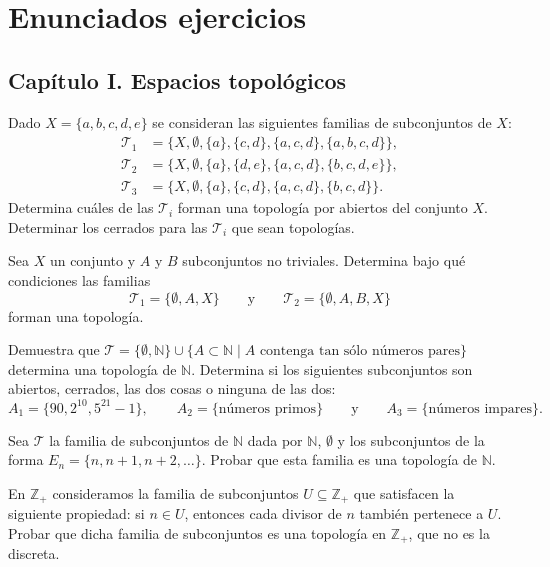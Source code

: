 \chapter{Enunciados ejercicios}
\section*{Capítulo I. Espacios topológicos}

\begin{ejer}[1]
Dado $X = \{a,b,c,d,e\}$ se consideran las siguientes familias de subconjuntos de $X$:
\begin{align*}
    \mathcal{T}_1 &= \{X, \emptyset, \{a\}, \{c,d\}, \{a,c,d\}, \{a,b,c,d\}\}, \\
    \mathcal{T}_2 &= \{X, \emptyset, \{a\}, \{d,e\}, \{a,c,d\}, \{b,c,d,e\}\}, \\
    \mathcal{T}_3 &= \{X, \emptyset, \{a\}, \{c,d\}, \{a,c,d\}, \{b,c,d\}\}.
\end{align*}
Determina cuáles de las $\mathcal{T}_i$ forman una topología por abiertos del conjunto $X$. Determinar los cerrados para las $\mathcal{T}_i$ que sean topologías.
\end{ejer}

\begin{ejer}[2]
Sea $X$ un conjunto y $A$ y $B$ subconjuntos no triviales. Determina bajo qué condiciones las familias
\[
    \mathcal{T}_1 = \{\emptyset, A, X\} \qquad \text{y} \qquad \mathcal{T}_2 = \{\emptyset, A, B, X\}
\]
forman una topología.
\end{ejer}

\begin{ejer}[3]
Demuestra que $\mathcal{T} = \{\emptyset, \mathbb{N}\} \cup \{A \subset \mathbb{N} \mid A \text{ contenga tan sólo números pares}\}$ determina una topología de $\mathbb{N}$. Determina si los siguientes subconjuntos son abiertos, cerrados, las dos cosas o ninguna de las dos:
\[
    A_1 = \{90, 2^{10}, 5^{21}-1\}, \qquad A_2 = \{\text{números primos}\} \qquad \text{y} \qquad A_3 = \{\text{números impares}\}.
\]
\end{ejer}

\begin{ejer}[4]
Sea $\mathcal{T}$ la familia de subconjuntos de $\mathbb{N}$ dada por $\mathbb{N}$, $\emptyset$ y los subconjuntos de la forma $E_n = \{n, n+1, n+2, \dots\}$. Probar que esta familia es una topología de $\mathbb{N}$.
\end{ejer}

\begin{ejer}[5]
En $\mathbb{Z}_+$ consideramos la familia de subconjuntos $U \subseteq \mathbb{Z}_+$ que satisfacen la siguiente propiedad: si $n \in U$, entonces cada divisor de $n$ también pertenece a $U$. Probar que dicha familia de subconjuntos es una topología en $\mathbb{Z}_+$, que no es la discreta.
\end{ejer}


